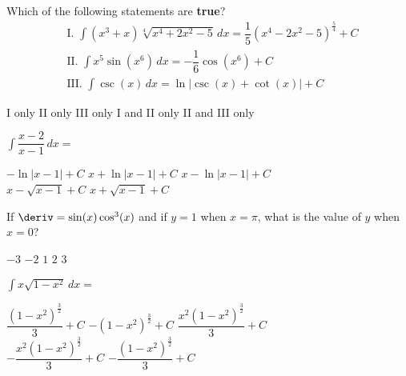 \begin{questions}
    \question Which of the following statements are \textbf{true}? \begin{align*}
        & \text{I. } \int \left(x^3 + x\right)\sqrt[4]{x^4 + 2x^2 - 5} \, dx = \dfrac{1}{5}\left(x^4 - 2x^2 - 5\right)^{\frac{5}{4}} + C \\[11pt]
        & \text{II. } \int x^5\sin \left(x^6\right) \, dx = -\dfrac{1}{6}\cos \left(x^6\right) + C \\[11pt]
        & \text{III. } \int \csc (x) \, dx = \ln |\csc (x) + \cot (x)| + C
    \end{align*}

    \begin{oneparchoices}
        \choice I only 
        \choice II only
        \choice III only 
        \choice I and II only
        \choice II and III only
    \end{oneparchoices} \par \horizontalline

    \question $\int \dfrac{x - 2}{x - 1} \, dx = $ \\

    \begin{oneparchoices}
        \choice $-\ln |x - 1| + C$
        \choice $x + \ln |x - 1| + C$
        \choice $x - \ln |x - 1| + C$ \\[11pt]
        \makebox[0.22\textwidth] \choice $x - \sqrt{x - 1} + C$
        \makebox[0.21\textwidth] \choice $x + \sqrt{x - 1} + C$
    \end{oneparchoices} \par \horizontalline

    \question If $\deriv = \sin (x)\cos^3 (x)$ and if $y = 1$ when $x = \pi$, what is the value of $y$ when $x = 0$? \\

    \begin{oneparchoices}
        \choice $-3$
        \choice $-2$
        \choice $1$
        \choice $2$
        \choice $3$
    \end{oneparchoices} \par \horizontalline

    \newpage

    \question $\int x\sqrt{1 - x^2} \, dx = $ \\
    
    \begin{oneparchoices}
        \choice $\dfrac{\left(1 - x^2\right)^{\frac{3}{2}}}{3} + C$
        \choice $-\left(1 - x^2\right)^{\frac{3}{2}} + C$
        \choice $\dfrac{x^2\left(1 - x^2\right)^{\frac{3}{2}}}{3} + C$ \\[11pt]
        \makebox[0.21\textwidth] \choice $-\dfrac{x^2\left(1 - x^2\right)^{\frac{3}{2}}}{3} + C$
        \makebox[0.20\textwidth] \choice $-\dfrac{\left(1 - x^2\right)^{\frac{3}{2}}}{3} + C$
    \end{oneparchoices} \par \horizontalline


\end{questions}
